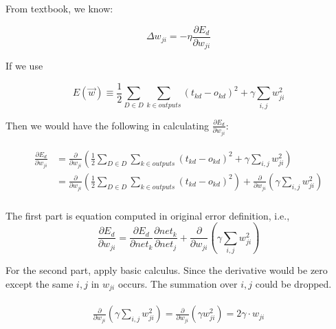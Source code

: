 \documentclass[preview]{standalone}
\begin{document}
\section{}

\subsection{}

From textbook, we know:

\[\Delta w_{ji} = -\eta\frac{\partial E_d}{\partial w_{ji}}\]

If we use 

\[E(\vec{w})\equiv\frac{1}{2}\sum_{D\in{D}}\sum_{{k\in{outputs}}}(t_{{kd}}-o_{{kd}})^2+\gamma\sum_{i,j}w_{ji}^2\]

Then we would have the following in calculating
$\displaystyle\frac{\partial E_d}{\partial w_{ji}}$:

\begin{align}
\begin{split}
\frac{\partial E_d}{\partial w_{ji}}
&= \frac{\partial}{\partial w_{ji}}\left(\frac{1}{2}\sum_{D\in{D}}\sum_{{k\in{outputs}}}(t_{{kd}}-o_{{kd}})^2+\gamma\sum_{i,j}w_{ji}^2 \right)\\
&=
\frac{\partial}{\partial w_{ji}}\left(\frac{1}{2}\sum_{D\in{D}}\sum_{{k\in{outputs}}}(t_{{kd}}-o_{{kd}})^2\right)
+
\frac{\partial}{\partial w_{ji}}\left(\gamma\sum_{i,j}w_{ji}^2 \right)\\
\end{split}
\end{align}

The first part is equation computed in original error definition, i.e.,
\[\frac{\partial E_d}{\partial w_{ji}}
= \frac{\partial E_d}{\partial net_{{k}}}\frac{\partial net_{{k}}}{\partial
net_{j}}
+
\frac{\partial}{\partial w_{ji}}\left(\gamma\sum_{i,j}w_{ji}^2 \right)\]

For the second part, apply basic calculus. Since the derivative would be zero
except the same $i,j$ in $w_{ji}$ occurs. The summation over $i,j$ could be
dropped.

\begin{align}
\begin{split}
\frac{\partial}{\partial w_{ji}}\left(\gamma\sum_{i,j}w_{ji}^2 \right)
= \frac{\partial}{\partial w_{ji}}\left(\gamma w_{ji}^2 \right)
= 2 \gamma \cdot w_{ji}
\end{split}
\end{align}
\end{document}
